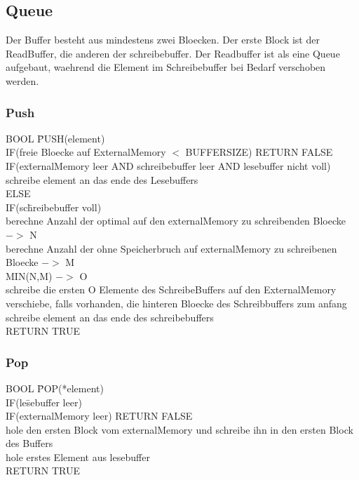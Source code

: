 \documentclass[10pt,a4paper]{article}
\begin{document}
\subsection{Queue}
Der Buffer besteht aus mindestens zwei Bloecken. Der erste Block ist der ReadBuffer, die anderen der schreibebuffer. Der Readbuffer ist als eine Queue aufgebaut, waehrend die Element im Schreibebuffer bei Bedarf verschoben werden.
\subsubsection{Push}
\begin{tabbing}
BOOL \= PUSH(element)\\
	\> IF(freie Bloecke auf ExternalMemory $<$ BUFFERSIZE) RETURN FALSE\\
	\> IF(ex\= ternalMemory leer AND schreibebuffer leer AND lesebuffer nicht voll)\\
		\>\> schreibe element an das ende des Lesebuffers\\
	\> ELSE\\
		\>\> IF(sc\= hreibebuffer voll)\\
			\>\>\> berechne Anzahl der optimal auf den externalMemory zu schreibenden Bloecke $->$ N\\
		\>\>\>	berechne Anzahl der ohne Speicherbruch auf externalMemory zu schreibenen Bloecke $->$ M\\
		\>\>\>	MIN(N,M) $->$ O\\
		\>\>\>	schreibe die ersten O Elemente des SchreibeBuffers auf den ExternalMemory\\
		\>\>\>	verschiebe, falls vorhanden, die hinteren Bloecke des Schreibbuffers zum anfang\\
		\>\> schreibe element an das ende des schreibebuffers\\
	\> RETURN TRUE\\
\end{tabbing}
\subsubsection{Pop}
\begin{tabbing}
BOOL \= POP(*element)\\
	\> IF(le\= sebuffer leer)\\
		\>\> IF(externalMemory leer) RETURN FALSE\\
		\>\> hole den ersten Block vom externalMemory und schreibe ihn in den ersten Block des Buffers\\
	\> hole erstes Element aus lesebuffer\\
	\> RETURN TRUE\\
\end{tabbing}
\end{document}
